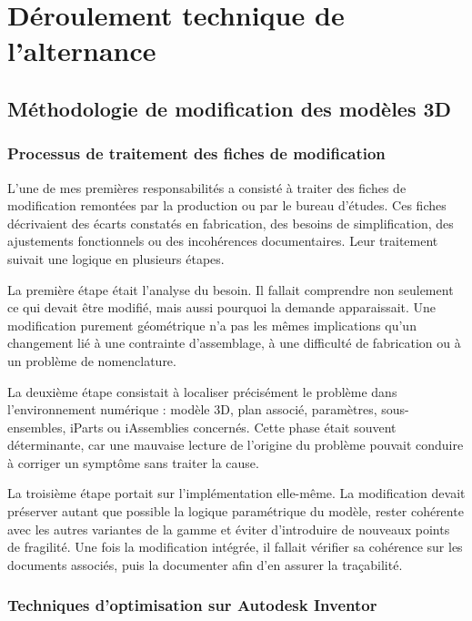 \chapter{Déroulement technique de l'alternance}

\section{Méthodologie de modification des modèles 3D}

\subsection{Processus de traitement des fiches de modification}

L'une de mes premières responsabilités a consisté à traiter des fiches de modification remontées par la production ou par le bureau d'études. Ces fiches décrivaient des écarts constatés en fabrication, des besoins de simplification, des ajustements fonctionnels ou des incohérences documentaires. Leur traitement suivait une logique en plusieurs étapes.

La première étape était l'analyse du besoin. Il fallait comprendre non seulement ce qui devait être modifié, mais aussi pourquoi la demande apparaissait. Une modification purement géométrique n'a pas les mêmes implications qu'un changement lié à une contrainte d'assemblage, à une difficulté de fabrication ou à un problème de nomenclature.

La deuxième étape consistait à localiser précisément le problème dans l'environnement numérique : modèle 3D, plan associé, paramètres, sous-ensembles, iParts ou iAssemblies concernés. Cette phase était souvent déterminante, car une mauvaise lecture de l'origine du problème pouvait conduire à corriger un symptôme sans traiter la cause.

La troisième étape portait sur l'implémentation elle-même. La modification devait préserver autant que possible la logique paramétrique du modèle, rester cohérente avec les autres variantes de la gamme et éviter d'introduire de nouveaux points de fragilité. Une fois la modification intégrée, il fallait vérifier sa cohérence sur les documents associés, puis la documenter afin d'en assurer la traçabilité.

\subsection{Techniques d'optimisation sur Autodesk Inventor}

